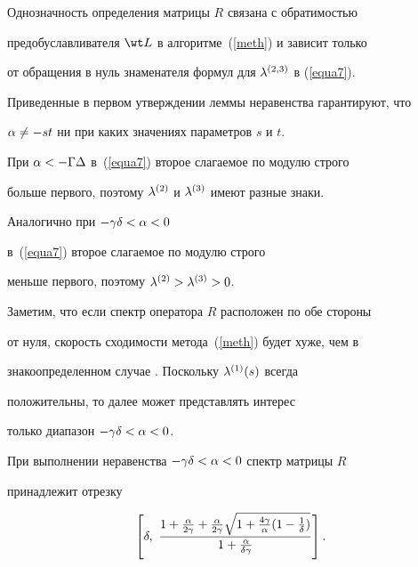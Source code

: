 \begin{pf}


Однозначность определения матрицы $R$ связана с обратимостью


предобуславливателя $\wt L$ в алгоритме~(\ref{meth}) и зависит только


от обращения в нуль знаменателя формул для $\lambda^{(2,3)}$ в (\ref{equa7}).


Приведенные в первом утверждении леммы неравенства гарантируют, что


$\alpha \neq - s t$ ни при каких значениях параметров $s$ и $t$.





При $\alpha < -\Gamma \Delta$ в~(\ref{equa7}) второе слагаемое по модулю строго


больше первого, поэтому $\lambda^{(2)}$ и $\lambda^{(3)}$ имеют разные знаки.





Аналогично при $-\gamma \delta < \alpha < 0$


в~(\ref{equa7}) второе слагаемое по модулю строго


меньше первого, поэтому $\lambda^{(2)} > \lambda^{(3)} > 0$.


\end{pf}





Заметим, что если спектр оператора $R$ расположен по обе стороны


от нуля, скорость сходимости метода~(\ref{meth}) будет хуже, чем в


знакоопределенном случае \cite{Leb}. Поскольку $\lambda^{(1)}(s)$ всегда


положительны, то далее может представлять интерес


только диапазон $-\gamma \delta < \alpha <0$.








\begin{lem}


При выполнении неравенства $-\gamma \delta < \alpha <0$ спектр матрицы $R$


принадлежит отрезку


$$


\left[\zd,\ \frac{1+ \frac{\za}{2\zg} + \frac{\za}{2\zg}


\sqrt{1+ \frac{4\zg}{\za} (1-\frac{1}{\zd} ) } }


{1+\frac{\za}{\zd \zg}}\right].


$$ 


\end{lem}





